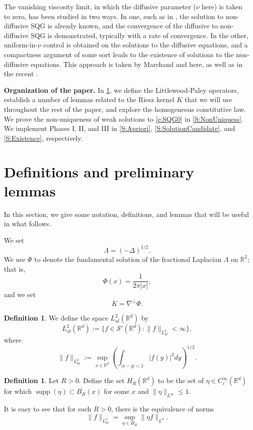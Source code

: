 \documentclass[11pt,reqno,xcolor=svgnames]{amsart}
\def\R{{\mathbb R}}
\theoremstyle{plain}
\theoremstyle{definition}
\newtheorem{definition}[theorem]{Definition}
\theoremstyle{plain}
\theoremstyle{remark}
\DeclareMathOperator{\supp}{supp}
\begin{document}
The vanishing viscosity limit, in which the diffusive parameter ($\nu$ here) is taken to zero, has been studied in two ways. In one, such as in \cite{Wu1997,Berselli}, the solution to non-diffusive SQG is already known, and the convergence of the diffusive to non-diffusive SQG is demonstrated, typically with a rate of convergence. In the other, uniform-in-$\nu$ control is obtained on the solutions to the diffusive equations, and a compactness argument of some sort leads to the existence of solutions to the non-diffusive equations. This approach is taken by Marchand \cite{Marchand} and here, as well as in the recent \cite{LuigiLatocca2026}.

















\smallskip\noindent\textbf{Organization of the paper.} In \cref{S:preliminary}, we define the Littlewood-Paley operators, establish a number of lemmas related to the Riesz kernel $K$ that we will use throughout the rest of the paper, and explore the homogeneous constitutive law. We prove the non-uniqueness of weak solutions to \cref{e:SQG0} in \cref{S:NonUniquess}. We implement Phases I, II, and III in \cref{S:Apriori}, \ref{S:SolutionCandidate}, and \ref{S:Existence}, respectively.





\section{Definitions and preliminary lemmas}\label{S:preliminary}
In this section, we give some notation, definitions, and lemmas that will be useful in what follows.  


We set $$\Lambda = (-\Delta)^{1/2}.$$  We use $\Phi$ to denote the fundamental solution of the fractional Laplacian $\Lambda$ on $\R^2$; that is,    
\begin{equation*}
	\Phi(x) = \frac{1}{2 \pi |x|},
\end{equation*}
and we set $$K=\nabla^{\perp}\Phi.$$  


\begin{definition}
We define the space $L^2_{ul} (\R^d)$ by
$$L^2_{ul} (\R^d) := \{ f\in \mathcal{S}'(\R^d) : \|f\|_{L^2_{ul}} <\infty\},$$
where
\begin{equation}
    \|f\|_{L^2_{ul}} := \sup_{x\in \R^d} \left(\int_{|x-y|<1} |f(y)|^2 dy\right)^{1/2}.
\end{equation}
\end{definition}
\begin{definition}\label{H}
Let $R>0$.  Define the set $H_R(\R^d)$ to be the set of $\eta\in C^\infty_c(\R^d)$ for which $\supp (\eta) \subset B_R(x)$ for some $x$ and $\|\eta\|_{L^{\infty}} \leq 1$.
\end{definition}
It is easy to see that for each $R>0$, there is the equivalence of norms
$$\|f\|_{L^2_{ul}} = \sup_{\eta\in H_R} \|\eta f \|_{L^2}.$$
\end{document}
